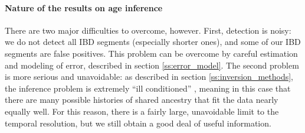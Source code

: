 \documentclass{article}
\begin{document}
\paragraph{Nature of the results on age inference}
There are two major difficulties to overcome, however.
First, detection is noisy: 
we do not detect all IBD segments (especially shorter ones),
and some of our IBD segments are false positives.
This problem can be overcome by 
careful estimation and modeling of error, described in section \ref{ss:error_model}.
The second problem is more serious and unavoidable:
as described in section \ref{ss:inversion_methods},
the inference problem 
is extremely ``ill conditioned'' \citep[in the sense of][]{petrov2005well},
meaning in this case that there are many possible histories of shared ancestry
that fit the data nearly equally well.
For this reason, there is a fairly large, unavoidable limit to the temporal resolution,
but we still obtain a good deal of useful information.
\end{document}
